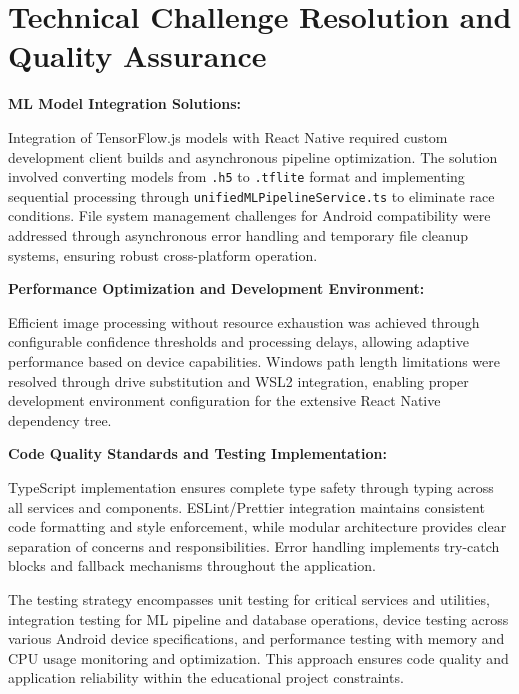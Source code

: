 \section{Technical Challenge Resolution and Quality Assurance}

\textbf{ML Model Integration Solutions:}

Integration of TensorFlow.js models with React Native required custom development client builds and asynchronous pipeline optimization. The solution involved converting models from \texttt{.h5} to \texttt{.tflite} format and implementing sequential processing through \texttt{unifiedMLPipelineService.ts} to eliminate race conditions. File system management challenges for Android compatibility were addressed through asynchronous error handling and temporary file cleanup systems, ensuring robust cross-platform operation.

\textbf{Performance Optimization and Development Environment:}

Efficient image processing without resource exhaustion was achieved through configurable confidence thresholds and processing delays, allowing adaptive performance based on device capabilities. Windows path length limitations were resolved through drive substitution and WSL2 integration, enabling proper development environment configuration for the extensive React Native dependency tree.

\textbf{Code Quality Standards and Testing Implementation:}

TypeScript implementation ensures complete type safety through typing across all services and components. ESLint/Prettier integration maintains consistent code formatting and style enforcement, while modular architecture provides clear separation of concerns and responsibilities. Error handling implements try-catch blocks and fallback mechanisms throughout the application.

The testing strategy encompasses unit testing for critical services and utilities, integration testing for ML pipeline and database operations, device testing across various Android device specifications, and performance testing with memory and CPU usage monitoring and optimization. This approach ensures code quality and application reliability within the educational project constraints.